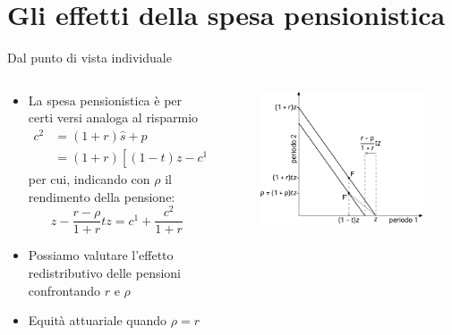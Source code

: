 \documentclass[aspectratio=64,12pt]{beamer}
\begin{document}
\section{Gli effetti della spesa pensionistica}

\begin{frame}{Dal punto di vista individuale}
\begin{columns}
\begin{column}{.5\columnwidth}
\begin{itemize}
\item La spesa pensionistica è per certi versi analoga al risparmio
\begin{equation*}
\begin{split}
  c^2&=(1+r)\hat{s}+p\\
  &=(1+r)[(1-t)z-c^1]+p
\end{split}
\end{equation*}
per cui, indicando con $\rho$ il rendimento della pensione:
\begin{equation*}
z-\frac{r-\rho}{1+r}tz=c^1+\frac{c^2}{1+r}
\end{equation*}
\item Possiamo valutare l'effetto redistributivo delle pensioni confrontando
$r$ e $\rho$
\item \alert{Equità attuariale} quando $\rho=r$
\end{itemize}
\end{column}

\begin{column}{.5\columnwidth}
\begin{figure}[htbp]
\centering
\includegraphics[width=\textwidth]{./figure/effetti-sul-risparmio-0.pdf}
\end{figure}
\end{column}
\end{columns}
\end{frame}
\end{document}
